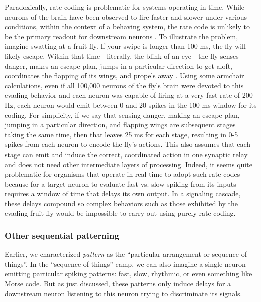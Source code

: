 Paradoxically, rate coding is problematic for systems operating in time.
While neurons of the brain have been observed to fire faster and slower under various conditions, within the context of a behaving system, the rate code is unlikely to be the primary readout for downstream neurons \cite{brettePhilosophySpikeRateBased2015, guoNeuralCodingSpiking2021}.
To illustrate the problem, imagine swatting at a fruit fly.
If your swipe is longer than 100 ms, the fly will likely escape.
Within that time---literally, the blink of an eye---the fly senses danger, makes an escape plan, jumps in a particular direction to get aloft, coordinates the flapping of its wings, and propels away \cite{fryeFlyFlightModel2001}.
Using some armchair calculations, even if all 100,000 neurons of the fly's brain were devoted to this evading behavior and each neuron was capable of firing at a very fast rate of 200 Hz, each neuron would emit between 0 and 20 spikes in the 100 ms window for its coding.
For simplicity, if we say that sensing danger, making an escape plan, jumping in a particular direction, and flapping wings are subsequent stages taking the same time, then that leaves 25 ms for each stage, resulting in 0-5 spikes from each neuron to encode the fly's actions. 
This also assumes that each stage can emit and induce the correct, coordinated action in one synaptic relay and does not need other intermediate layers of processing.
Indeed, it seems quite problematic for organisms that operate in real-time to adopt such rate codes because for a target neuron to evaluate fast vs. slow spiking from its inputs requires a window of time that delays its own output.
In a signaling cascade, these delays compound so complex behaviors such as those exhibited by the evading fruit fly would be impossible to carry out using purely rate coding.

\subsubsection{Other sequential patterning}

Earlier, we characterized \emph{pattern} as the ``particular arrangement or sequence of things''.
In the ``sequence of things'' camp, we can also imagine a single neuron emitting particular spiking patterns: fast, slow, rhythmic, or even something like Morse code.
But as just discussed, these patterns only induce delays for a downstream neuron listening to this neuron trying to discriminate its signals.

